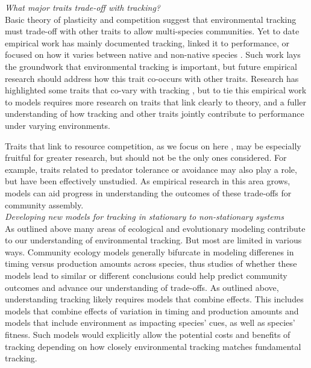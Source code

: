 \documentclass[11pt,letterpaper]{article}
\begin{document}
\emph{What major traits trade-off with tracking?} \\ 
Basic theory of plasticity and competition suggest that environmental tracking must trade-off with other traits to allow multi-species communities. Yet to date empirical work has mainly documented tracking, linked it to performance, or focused on how it varies between native and non-native species \citep{Willis:2010al,wolkovichAmBot2013,Zettlemoyer2019}. Such work lays the groundwork that environmental tracking is important, but future empirical research should address how this trait co-occurs with other traits. Research has highlighted some traits that co-vary with tracking \citep[e.g.,][]{kharouba2014,lasky2016,Zhu2016BioLetters}, but to tie this empirical work to models requires more research on traits that link clearly to theory, and a fuller understanding of how tracking and other traits jointly contribute to performance under varying environments. 

Traits that link to resource competition, as we focus on here \citep[as others have as well, see][]{volkerass}, may be especially fruitful for greater research, but should not be the only ones considered. For example, traits related to predator tolerance or avoidance may also play a role, but have been effectively unstudied.  As empirical research in this area grows, models can aid progress in understanding the outcomes of these trade-offs for community assembly.\\ 

\emph{Developing new models for tracking in stationary to non-stationary systems} \\ 
As outlined above many areas of ecological and evolutionary modeling contribute to our understanding of environmental tracking. But most are limited in various ways. Community ecology models generally bifurcate in modeling differenes in timing versus production amounts across species, thus studies of whether these models lead to similar or different conclusions could help predict community outcomes and advance our understanding of trade-offs. As outlined above, understanding tracking likely requires models that combine effects. This includes models that combine effects of variation in timing and production amounts and models that include environment as impacting species' cues, as well as species' fitness. Such models would explicitly allow the potential costs and benefits of tracking depending on how closely environmental tracking matches fundamental tracking.
\end{document}
